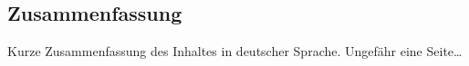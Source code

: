

\begin{otherlanguage}{ngerman}
	\chapter*{Zusammenfassung}
	Kurze Zusammenfassung des Inhaltes in deutscher Sprache. Ungefähr eine Seite\dots
\end{otherlanguage}